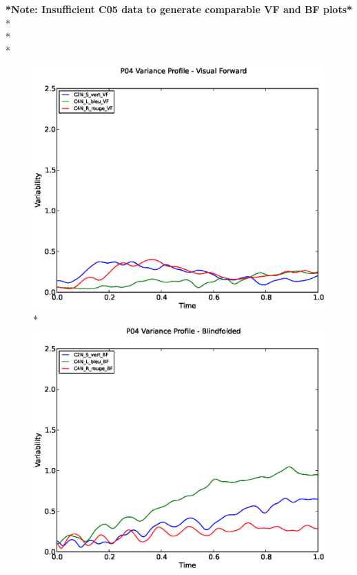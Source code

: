 \documentclass[a4page,landscape,twocolumn,10pt]{article}
\begin{document}
\newpage
\textbf{*Note: Insufficient C05 data to generate comparable VF and BF plots*}
\\*
\\*
\\*
\begin{figure}[!htbp]
  \centering
  \includegraphics[width=0.5\linewidth]{P04_Variability_profile_VF.eps}
  \\*
  \includegraphics[width=0.5\linewidth]{P04_Variability_profile_BF.eps}

\end{figure}

\clearpage
\end{document}
